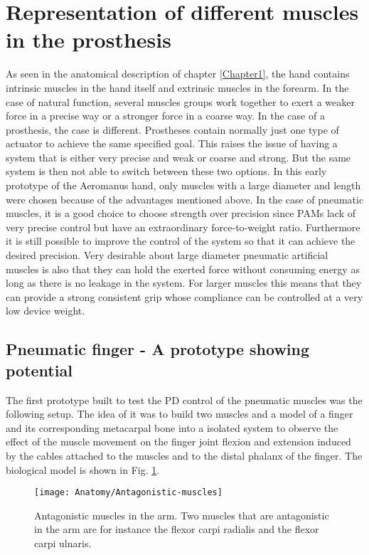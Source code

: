 \documentclass[main]{subfiles}
\begin{document}
\section{Representation of different muscles in the prosthesis}

As seen in the anatomical description of chapter \ref{Chapter1}, the hand contains intrinsic muscles in the hand itself and extrinsic muscles in the forearm. In the case of natural function, several muscles groups work together to exert a weaker force in a precise way or a stronger force in a coarse way. In the case of a prosthesis, the case is different. Prostheses contain normally just one type of actuator to achieve the same specified goal. This raises the issue of having a system that is either very precise and weak or coarse and strong. But the same system is then not able to switch between these two options. In this early prototype of the Aeromanus hand, only muscles with a large diameter and length were chosen because of the advantages mentioned above. In the case of pneumatic muscles, it is a good choice to choose strength over precision since PAMs lack of very precise control but have an extraordinary force-to-weight ratio. Furthermore it is still possible to improve the control of the system so that it can achieve the desired precision. Very desirable about large diameter pneumatic artificial muscles is also that they can hold the exerted force without consuming energy as long as there is no leakage in the system. For larger muscles this means that they can provide a strong consistent grip whose compliance can be controlled at a very low device weight.

\subsection{Pneumatic finger - A prototype showing potential}

The first prototype built to test the PD control of the pneumatic muscles was the following setup. The idea of it was to build two muscles and a model of a finger and its corresponding metacarpal bone into a isolated system to observe the effect of the muscle movement on the finger joint flexion and extension induced by the cables attached to the muscles and to the distal phalanx of the finger. The biological model is shown in Fig. \ref{antagonistic-muscles}.

\begin{figure}[H]
\centering
\texttt{[image: Anatomy/Antagonistic-muscles]}
\caption[Antagonistic muscles]{Antagonistic muscles in the arm. Two muscles that are antagonistic in the arm are for instance the flexor carpi radialis and the flexor carpi ulnaris.}
\label{antagonistic-muscles}
\end{figure}
\end{document}
